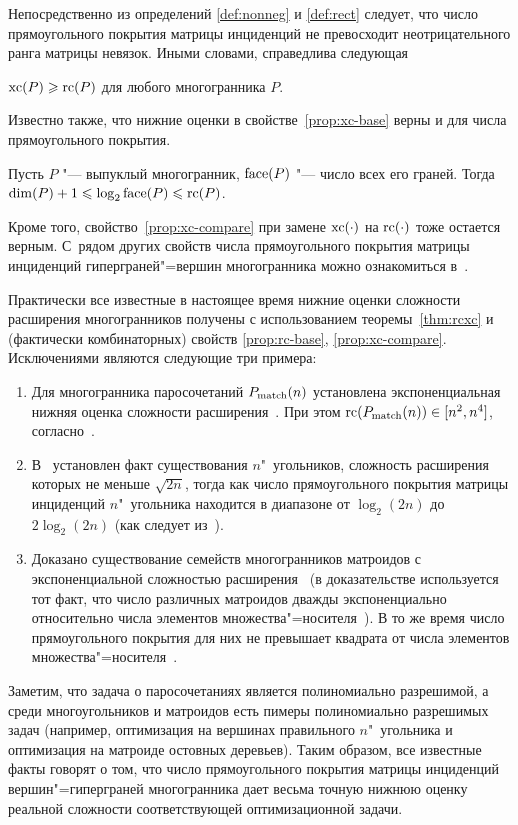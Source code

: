 Непосредственно из определений \ref{def:nonneg} и \ref{def:rect} следует, что число прямоугольного покрытия матрицы инциденций не превосходит неотрицательного ранга матрицы невязок.
Иными словами, справедлива следующая

\begin{theorem}
	\label{thm:rcxc}
	$\operatorname{xc}(P) \geqslant \operatorname{rc}(P)$ для любого многогранника $P$.
\end{theorem}

Известно также, что нижние оценки в свойстве~\ref{prop:xc-base} верны и для числа прямоугольного покрытия.

\begin{property}\label{prop:rc-base}
	Пусть $P$ "--- выпуклый многогранник, $\operatorname{face}(P)$ "--- число всех его граней. Тогда \(\dim(P) + 1 \leqslant \log_2 \operatorname{face}(P) \leqslant \operatorname{rc}(P)\).
\end{property}

Кроме того, свойство~\ref{prop:xc-compare} при замене $\operatorname{xc}(\cdot)$ на $\operatorname{rc}(\cdot)$ тоже остается верным.
С~рядом других свойств числа прямоугольного покрытия матрицы инциденций гиперграней"=вершин многогранника можно ознакомиться в~\cite{FioriniKPT:13}.

Практически все известные в настоящее время нижние оценки сложности расширения многогранников получены с использованием теоремы~\ref{thm:rcxc} и (фактически комбинаторных) свойств \ref{prop:rc-base}, \ref{prop:xc-compare}.
Исключениями являются следующие три примера:
\begin{enumerate}
	\item Для многогранника паросочетаний $P_{\textup{match}}(n)$ установлена экспоненциальная нижняя оценка сложности расширения~\cite{Rothvoss:2014}.
	При этом $\operatorname{rc}(P_{\textup{match}}(n)) \in [n^2, n^4]$, согласно~\cite{FioriniKPT:13}.
	\item В~\cite{Fiorini:2012polygons} установлен факт существования $n$"~угольников, сложность расширения которых не меньше $\sqrt{2n}$, тогда как
	число прямоугольного покрытия матрицы инциденций $n$"~угольника находится в диапазоне от $\log_2 (2n)$ до $2\log_2 (2n)$ (как следует из~\cite{BenTal:2001, Fiorini:2012polygons}).
	\item Доказано существование семейств многогранников матроидов с экспоненциальной сложностью расширения~\cite{Rothvoss:2013} (в доказательстве используется тот факт, что число различных матроидов дважды экспоненциально относительно числа элементов множества"=носителя~\cite{Dukes:2003}). В то же время число прямоугольного покрытия для них не превышает квадрата от числа элементов множества"=носителя~\cite{Kaibel:2016}.
\end{enumerate}
Заметим, что задача о паросочетаниях является полиномиально разрешимой, а среди многоугольников и матроидов есть пимеры полиномиально разрешимых задач (например, оптимизация на вершинах правильного $n$"~угольника и оптимизация на матроиде остовных деревьев).
Таким образом, все известные факты говорят о том, что число прямоугольного покрытия матрицы инциденций вершин"=гиперграней многогранника дает весьма точную нижнюю оценку реальной сложности соответствующей оптимизационной задачи.



